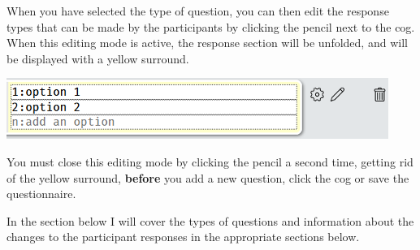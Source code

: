 \documentclass[]{book}
\begin{document}
When you have selected the type of question, you can then edit the response types that can be made by the participants by clicking the pencil next to the cog. When this editing mode is active, the response section will be unfolded, and will be displayed with a yellow surround.

\includegraphics{images/screenshots/quest_mixed_2.png}

\begin{warning}
You must close this editing mode by clicking the pencil a second time,
getting rid of the yellow surround, \textbf{before} you add a new
question, click the cog or save the questionnaire.
\end{warning}

In the section below I will cover the types of questions and information about the changes to the participant responses in the appropriate sections below.
\end{document}

